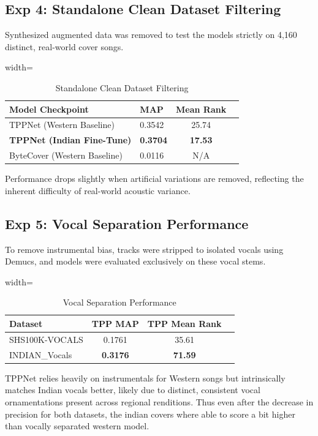 \documentclass[conference]{IEEEtran}
\begin{document}
\subsection{Exp 4: Standalone Clean Dataset Filtering}
Synthesized augmented data was removed to test the models strictly on 4,160 distinct, real-world cover songs.

\begin{table}[htbp]
    \caption{Standalone Clean Dataset Filtering}
    \centering
    \begin{adjustbox}{width=\columnwidth}
    \begin{tabular}{llcc}
    \toprule
    \textbf{Model Checkpoint} & \textbf{MAP} & \textbf{Mean Rank} \\
    \midrule
    TPPNet (Western Baseline)  & 0.3542 & 25.74 \\
    \textbf{TPPNet (Indian Fine-Tune)} & \textbf{0.3704} & \textbf{17.53} \\
    ByteCover (Western Baseline) & 0.0116 & N/A \\
    \bottomrule
    \end{tabular}
    \end{adjustbox}
    \vspace{0.1cm}
\end{table}
 Performance drops slightly when artificial variations are removed, reflecting the inherent difficulty of real-world acoustic variance.

\subsection{Exp 5: Vocal Separation Performance}
To remove instrumental bias, tracks were stripped to isolated vocals using Demucs, and models were evaluated exclusively on these vocal stems.

\begin{table}[htbp]
    \caption{Vocal Separation Performance}
    \centering
    \begin{adjustbox}{width=\columnwidth}
    \begin{tabular}{lccc}
    \toprule
    \textbf{Dataset} & \textbf{TPP MAP} & \textbf{TPP Mean Rank}  \\
    \midrule
    SHS100K-VOCALS & 0.1761 & 35.61  \\
    INDIAN\_Vocals & \textbf{0.3176} & \textbf{71.59} \\
    \bottomrule
    \end{tabular}
    \end{adjustbox}
\end{table}
 TPPNet relies heavily on instrumentals for Western songs but intrinsically matches Indian vocals better, likely due to distinct, consistent vocal ornamentations present across regional renditions.
 Thus even after the decrease in precision for both datasets, the indian covers where able to score a bit higher than vocally separated western model.
\end{document}
